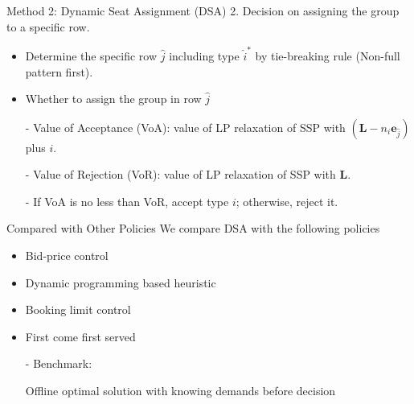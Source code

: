     \begin{frame}{Method 2: Dynamic Seat Assignment (DSA)}
      2. Decision on assigning the group to a specific row.
      \vspace{0.2cm}

      \begin{itemize}
        \item Determine the specific row $\hat{j}$ including type $\hat{i}^{*}$ by tie-breaking rule (Non-full pattern first). 
        \item Whether to assign the group in row $\hat{j}$
        \item[-] Value of Acceptance (VoA): value of LP relaxation of SSP with $(\mathbf{L}-n_{i} \mathbf{e}_{\hat{j}})$ plus $i$.
        

        \item[-] Value of Rejection (VoR): value of LP relaxation of SSP with $\mathbf{L}$.

        \item[-] If VoA is no less than VoR, accept type $i$; otherwise, reject it.
      \end{itemize}
    \end{frame}


    \begin{frame}{Compared with Other Policies}
      We compare DSA with the following policies 
      
      \vspace{0.5cm}
      
      \begin{itemize}
        \item Bid-price control
        \item Dynamic programming based heuristic
        \item Booking limit control
        \item First come first served
        \vspace{0.1cm}
        \item[-] Benchmark: 
        
        Offline optimal solution with knowing demands before decision
      \end{itemize}
    \end{frame}

